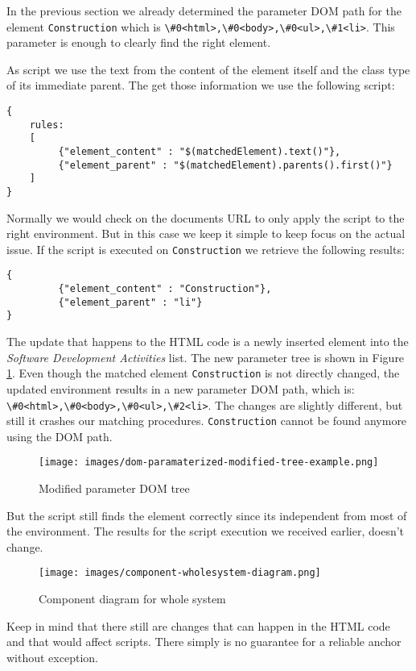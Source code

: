 In the previous section we already determined the parameter DOM path for the element \verb^Construction^ which is \verb^\#0<html>,\#0<body>,\#0<ul>,\#1<li>^. This parameter is enough to clearly find the right element. 

As script we use the text from the content of the element itself and the class type of its immediate parent. The get those information we use the following script:
\begin{lstlisting}
{
    rules:
    [
         {"element_content" : "$(matchedElement).text()"},
         {"element_parent" : "$(matchedElement).parents().first()"}
    ]
}
\end{lstlisting}

Normally we would check on the documents URL to only apply the script to the right environment. But in this case we keep it simple to keep focus on the actual issue. If the script is executed on \verb^Construction^ we retrieve the following results:

\begin{lstlisting}
{
         {"element_content" : "Construction"},
         {"element_parent" : "li"}
}
\end{lstlisting}

The update that happens to the HTML code is a newly inserted element into the \emph{Software Development Activities} list. The new parameter tree is shown in Figure \ref{dom-paramaterized-modified-tree-example}. Even though the matched element \verb^Construction^ is not directly changed, the updated environment results in a new parameter DOM path, which is:
\verb^\#0<html>,\#0<body>,\#0<ul>,\#2<li>^. The changes are slightly different, but still it crashes our matching procedures. \verb^Construction^ cannot be found anymore using the DOM path. 


\begin{figure}\centering
		\texttt{[image: images/dom-paramaterized-modified-tree-example.png]}
		\caption{Modified parameter DOM tree}
		\label{dom-paramaterized-modified-tree-example}
\end{figure} 

But the script still finds the element correctly since its independent from most of the environment. The results for the script execution we received earlier, doesn't change. 

\begin{figure}\centering
	\texttt{[image: images/component-wholesystem-diagram.png]}
	\caption{Component diagram for whole system}
	\label{component-wholesystem-diagram}
\end{figure}

Keep in mind that there still are changes that can happen in the HTML code and that would affect scripts. There simply is no guarantee for a reliable anchor without exception.

\newpage

 
